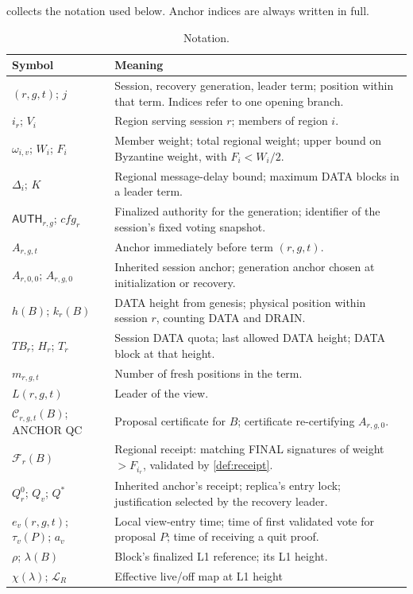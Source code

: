 \documentclass[11pt,a4paper]{article}
\newcommand{\QC}{\mathcal C}
\newcommand{\FC}{\mathcal F}
\newcommand{\TB}{\mathit{TB}}
\newcommand{\tagg}[1]{\ensuremath{\mathsf{#1}}}
\begin{document}
 collects the notation used below. Anchor indices
are always written in full.
\begin{table}[htbp]\centering\small
\caption{Notation.}\label{tab:notation}
\begin{tabularx}{\linewidth}{@{}p{.29\linewidth}Y@{}}
\toprule Symbol & Meaning\\\midrule
$(r,g,t)$; $j$ & Session, recovery generation, leader term; position
within that term. Indices refer to one opening branch.\\
$i_r$; $V_i$ & Region serving session $r$; members of region $i$.\\
$\omega_{i,v}$; $W_i$; $F_i$ & Member weight; total regional weight;
upper bound on Byzantine weight, with $F_i<W_i/2$.\\
$\Delta_i$; $K$ & Regional message-delay bound; maximum DATA blocks
in a leader term.\\
$\tagg{AUTH}_{r,g}$; $\mathit{cfg}_r$ & Finalized authority for the
generation; identifier of the session's fixed voting snapshot.\\
$A_{r,g,t}$ & Anchor immediately before term $(r,g,t)$.\\
$A_{r,0,0}$; $A_{r,g,0}$ & Inherited session anchor; generation anchor
chosen at initialization or recovery.\\
$h(B)$; $k_r(B)$ & DATA height from genesis; physical position within
session $r$, counting DATA and DRAIN.\\
$\TB_r$; $H_r$; $T_r$ & Session DATA quota; last allowed DATA height;
DATA block at that height.\\
$m_{r,g,t}$ & Number of fresh positions in the term.\\
$L(r,g,t)$ & Leader of the view.\\
$\QC_{r,g,t}(B)$; ANCHOR QC & Proposal certificate for $B$;
certificate re-certifying $A_{r,g,0}$.\\
$\FC_r(B)$ & Regional receipt: matching FINAL signatures of weight
$>F_{i_r}$, validated by \cref{def:receipt}.\\
$Q_r^0$; $Q_v$; $Q^*$ & Inherited anchor's receipt; replica's entry
lock; justification selected by the recovery leader.\\
$e_v(r,g,t)$; $\tau_v(P)$; $a_v$ & Local view-entry time; time of first
validated vote for proposal $P$; time of receiving a quit proof.\\
$\rho$; $\lambda(B)$ & Block's finalized L1 reference; its L1 height.\\
$\chi(\lambda)$; $\mathcal L_R$ & Effective live/off map at L1 height

\end{tabularx}
\end{table}
\end{document}
